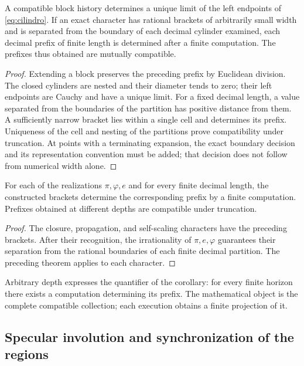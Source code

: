 \begin{theorem}
A compatible block history determines a unique limit of the left endpoints of \eqref{eq:cilindro}. If an exact character has rational brackets of arbitrarily small width and is separated from the boundary of each decimal cylinder examined, each decimal prefix of finite length is determined after a finite computation. The prefixes thus obtained are mutually compatible.
\end{theorem}
\begin{proof}
Extending a block preserves the preceding prefix by Euclidean division. The closed cylinders are nested and their diameter tends to zero; their left endpoints are Cauchy and have a unique limit. For a fixed decimal length, a value separated from the boundaries of the partition has positive distance from them. A sufficiently narrow bracket lies within a single cell and determines its prefix. Uniqueness of the cell and nesting of the partitions prove compatibility under truncation. At points with a terminating expansion, the exact boundary decision and its representation convention must be added; that decision does not follow from numerical width alone.
\end{proof}

\begin{corollary}
\label{gen:prefijos-regionales}
For each of the realizations \(\pi,\varphi,e\) and for every finite
decimal length, the constructed brackets determine the corresponding prefix
by a finite computation. Prefixes obtained at different depths
are compatible under truncation.
\end{corollary}
\begin{proof}
The closure, propagation, and self-scaling characters have the preceding
brackets. After their recognition, the irrationality of \(\pi,e,\varphi\)
guarantees their separation from the rational boundaries of each finite decimal
partition. The preceding theorem applies to each character.
\end{proof}
Arbitrary depth expresses the quantifier of the corollary: for every
finite horizon there exists a computation determining its prefix. The
mathematical object is the complete compatible collection; each execution obtains a
finite projection of it.

\subsection{Specular involution and synchronization of the regions}

